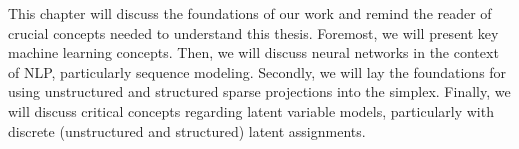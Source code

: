 \label{chap:background}

\cleardoublepage
\doublespacing

\noindent This chapter will discuss the foundations of our work and
remind the reader of crucial concepts needed to understand this
thesis. Foremost, we will present key machine learning concepts.
Then, we will discuss neural networks in the context of NLP,
particularly sequence modeling. Secondly, we will lay the foundations
for using unstructured and structured sparse projections into the
simplex. Finally, we will discuss critical
concepts regarding latent variable models, particularly with discrete
(unstructured and structured) latent assignments.





\cleardoublepage
\singlespacing
